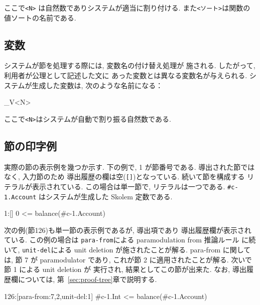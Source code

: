 ここで\texttt{<N>} は自然数でありシステムが適当に割り付ける.
また\texttt{<ソート>}は関数の値ソートの名前である.

\subsection{変数}

システムが節を処理する際には, 変数名の付け替え処理が
施される. したがって, 利用者が公理として記述した文に
あった変数とは異なる変数名が与えられる. 
システムが生成した変数は, 次のような名前になる：

\begin{vvtm}
\begin{simplev}
  _V<N>
\end{simplev}
\end{vvtm}

ここで\texttt{<N>}はシステムが自動で割り振る自然数である. 

\subsection{節の印字例}

実際の節の表示例を幾つか示す.
下の例で, 1 が節番号である. 導出された節ではなく, 入力節のため
導出履歴の欄は空(\texttt{[]})となっている. 続いて節を構成する
リテラルが表示されている. この場合は単一節で, リテラルは一つである.
\texttt{\#c-1.Account} はシステムが生成した Skolem 定数である.

\begin{vvtm}
\begin{simplev}
  1:[] 0 <= balance(#c-1.Account)
\end{simplev}
\end{vvtm}

次の例(節126)も単一節の表示例であるが, 導出項であり
導出履歴欄が表示されている.
この例の場合は \texttt{para-from}による paramodulation from 推論ルール
に続いて, \texttt{unit-del}による unit deletion が施されたことが解る.
para-from に関しては, 節 7 が paramodulator であり, これが節
2 に適用されたことが解る. 次いで 節 1 による unit deletion が
実行され, 結果としてこの節が出来た. 
なお, 導出履歴欄については, 第~\ref{sec:proof-tree}章で説明する.

\begin{vvtm}
\begin{simplev}
  126:[para-from:7,2,unit-del:1] 
    #c-1.Int <= balance(#c-1.Account)
\end{simplev}
\end{vvtm}

